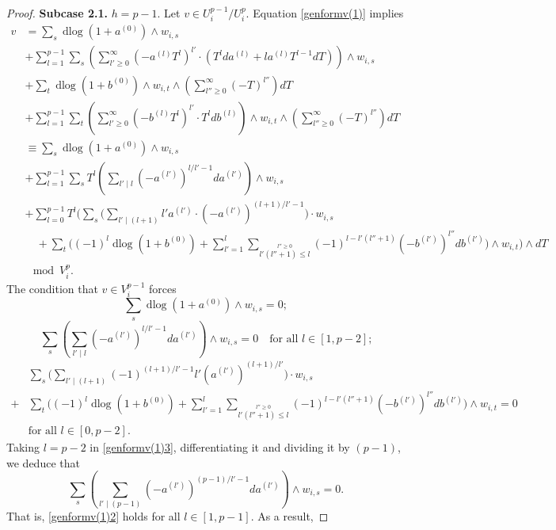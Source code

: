 \documentclass[11pt]{amsart}
\newcommand{\eq}[2]{\begin{equation}\label{#1}#2 \end{equation}}
\newcommand{\dlog}{\operatorname{dlog}}
\theoremstyle{plain}
\theoremstyle{definition}
\numberwithin{equation}{prop}
\begin{document}
\begin{proof}
\textbf{Subcase 2.1.} $h=p-1$.
Let $v \in U^{p-1}_i/U^p_i$. Equation \eqref{genformv(1)} implies
\begin{align*}
v&=
\sum_s \dlog(1+a^{(0)})\wedge  w_{i,s}
\\&+
\sum_{l=1}^{p-1}\sum_s 
\left(
\sum_{l'\ge 0}^{\infty}
(-a^{(l)}T^l)^{l'}\cdot (T^lda^{(l)}+la^{(l)}T^{l-1}dT)
\right)\wedge  w_{i,s}
\\&+
\sum_t \dlog(1+b^{(0)})\wedge  w_{i,t} \wedge
\left(\sum_{l''\ge 0}^{\infty} (-T)^{l''}\right)dT
\\&+
\sum_{l=1}^{p-1}\sum_t 
\left( 
\sum_{l'\ge 0}^{\infty}
(-b^{(l)}T^l)^{l'}\cdot T^ldb^{(l)}
\right)
\wedge  w_{i,t}
\wedge 
\left(\sum_{l''\ge 0}^{\infty} (-T)^{l''}\right)dT
\\
&\equiv
\sum_s \dlog(1+a^{(0)})\wedge  w_{i,s}
\\&+
\sum_{l=1}^{p-1} \sum_s 
T^{l}\left(
\sum_{l'\mid l} (-a^{(l')})^{l/l'-1}da^{(l')}
\right)\wedge w_{i,s}
\\&+
\sum_{l=0}^{p-1}  
T^l\Bigg(
\sum_s
\Bigg(
\sum_{l'\mid (l+1)} l' a^{(l')}\cdot  (-a^{(l')})^{(l+1)/l'-1}
\Bigg)\cdot  w_{i,s}
\\
&\quad
+
\sum_t
\Bigg(
(-1)^l\dlog(1+b^{(0)})
+
\sum_{l'=1}^l \sum_{
\stackrel{l''\ge 0}{ l'(l''+1)\le l}}
(-1)^{l-l'(l''+1)}(-b^{(l')})^{l''}db^{(l')}
\Bigg)\wedge w_{i,t}
\Bigg)
\wedge dT
\\&
\mod V_i^p.
\end{align*}
The condition that $v\in V_i^{p-1}$ forces
\eq{genformv(1)1}{
\sum_s \dlog(1+a^{(0)})\wedge  w_{i,s}=0;
}
\eq{genformv(1)2}{
\sum_s 
\left(
\sum_{l'\mid l} (-a^{(l')})^{l/l'-1}da^{(l')}
\right)\wedge w_{i,s}=0
\quad
\text{for all $l\in[1,p-2]$;}
}
\begin{align}
\label{genformv(1)3}
&\sum_s 
\Bigg(
\sum_{l'\mid (l+1)}
(-1)^{(l+1)/l'-1} l'  (a^{(l')})^{(l+1)/l'}
\Bigg)\cdot  w_{i,s}
\\
+&
\sum_t 
\Bigg(
(-1)^l\dlog(1+b^{(0)})
+
\sum_{l'=1}^l \sum_{
\stackrel{l''\ge 0}{ l'(l''+1)\le l}}
(-1)^{l-l'(l''+1)}(-b^{(l')})^{l''}db^{(l')}
\Bigg)\wedge w_{i,t}
=0
\nonumber
\\
&\text{for all $l\in[0,p-2]$.}
\nonumber
\end{align}
Taking $l=p-2$ in
\eqref{genformv(1)3}, differentiating it and dividing it by  $(p-1)$, we deduce that
$$\sum_s
\left(
\sum_{l'\mid (p-1)} (-a^{(l')})^{(p-1)/l'-1}da^{(l')}
\right)\wedge w_{i,s}=0.
$$
That is, \eqref{genformv(1)2} holds for all $l\in [1,p-1]$.
As a result,

\end{proof}
\end{document}
